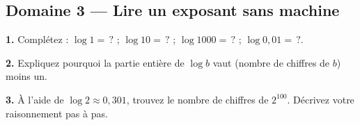 \documentclass[11pt,a4paper]{article}
\begin{document}
\subsection*{Domaine 3 --- Lire un exposant sans machine}
\textbf{1.} Complétez : $\log 1 = \,?$ ; $\log 10 = \,?$ ; $\log 1000 = \,?$ ; $\log 0{,}01 = \,?$.
\par\smallskip
\noindent\makebox[\linewidth]{\dotfill}\par\vspace{1em}
\noindent\makebox[\linewidth]{\dotfill}\par\vspace{1em}
\noindent\makebox[\linewidth]{\dotfill}\par\vspace{1em}
\par\medskip
\textbf{2.} Expliquez pourquoi la partie entière de $\log b$ vaut (nombre de chiffres de $b$) moins un.
\par\smallskip
\noindent\makebox[\linewidth]{\dotfill}\par\vspace{1em}
\noindent\makebox[\linewidth]{\dotfill}\par\vspace{1em}
\noindent\makebox[\linewidth]{\dotfill}\par\vspace{1em}
\par\medskip
\textbf{3.} À l'aide de $\log 2 \approx 0{,}301$, trouvez le nombre de chiffres de $2^{100}$. Décrivez votre raisonnement pas à pas.
\par\smallskip
\noindent\makebox[\linewidth]{\dotfill}\par\vspace{1em}
\noindent\makebox[\linewidth]{\dotfill}\par\vspace{1em}
\noindent\makebox[\linewidth]{\dotfill}\par\vspace{1em}
\par\medskip
\end{document}
